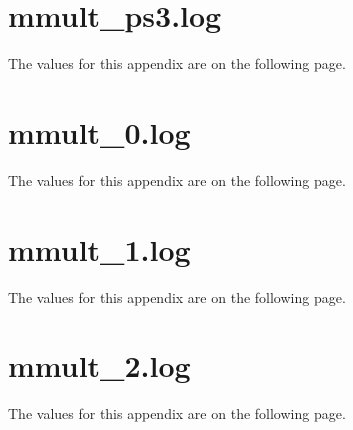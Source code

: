 \documentclass{article}
\begin{document}
\begin{appendices}

\section{mmult\_ps3.log}
\label{appendix:mmult-ps3} 
The values for this appendix are on the following page. 


\section{mmult\_0.log}
\label{appendix:mmult-0} 
The values for this appendix are on the following page. 


\section{mmult\_1.log}
\label{appendix:mmult-1} 
The values for this appendix are on the following page. 


\section{mmult\_2.log}
\label{appendix:mmult-2} 
The values for this appendix are on the following page. 


\end{appendices}
\end{document}
